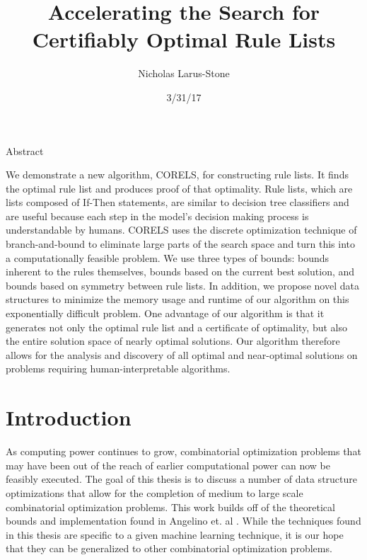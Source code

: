 \documentclass[]{report}
\theoremstyle{definition}
\begin{document}
\title{Accelerating the Search for Certifiably Optimal Rule Lists}
\author{Nicholas Larus-Stone}
\date{3/31/17}
\maketitle

\begin{center}
Abstract
\end{center}

We demonstrate a new algorithm, CORELS, for constructing rule lists. It finds the optimal rule list and produces proof of that optimality. Rule lists, which are lists composed of If-Then statements, are similar to decision tree classifiers and are useful because each step in the model's decision making process is understandable by humans. CORELS uses the discrete optimization technique of branch-and-bound to eliminate large parts of the search space and turn this into a computationally feasible problem. We use three types of bounds: bounds inherent to the rules themselves, bounds based on the current best solution, and bounds based on symmetry between rule lists. In addition, we propose novel data structures to minimize the memory usage and runtime of our algorithm on this exponentially difficult problem. One advantage of our algorithm is that it generates not only the optimal rule list and a certificate of optimality, but also the entire solution space of nearly optimal solutions. Our algorithm therefore allows for the analysis and discovery of all optimal and near-optimal solutions on problems requiring human-interpretable algorithms.

\chapter{Introduction}
\label{introduction}

As computing power continues to grow, combinatorial optimization problems that may have been out of the reach of earlier computational power can now be feasibly executed.
The goal of this thesis is to discuss a number of data structure optimizations that allow for the completion of medium to large scale combinatorial optimization problems.
This work builds off of the theoretical bounds and implementation found in Angelino et. al \cite{AngelinoLaAlSeRu17}.
While the techniques found in this thesis are specific to a given machine learning technique, it is our hope that they can be generalized to other combinatorial optimization problems.
\end{document}
